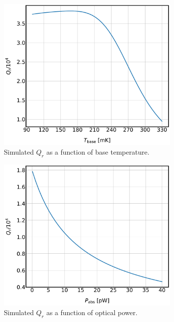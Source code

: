 \begin{figure}[!htbp]
\centering
\includegraphics[width=0.8\textwidth]{figures/kid_model/Qr_v_T}
\caption[~Simulated  as a function of base temperature.]{Simulated $Q_{r}$ as a function of base temperature.}
\label{fig:Qr_T}
\end{figure}

\begin{figure}[!htbp]
\centering
\includegraphics[width=0.8\textwidth]{figures/kid_model/Qr_v_P}
\caption[~Simulated  as a function of optical power.]{Simulated $Q_{r}$ as a function of optical power.}
\label{fig:Qr_P}
\end{figure}

